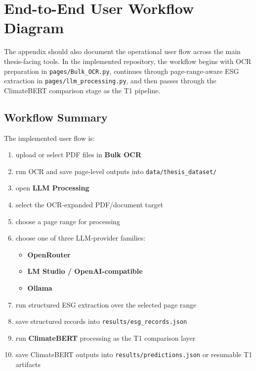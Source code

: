 \documentclass[english, online, cse, master]{dithesis}
\providecommand{\tightlist}{\setlength{\itemsep}{0pt}\setlength{\parskip}{0pt}}
\begin{document}
\section{End-to-End User Workflow Diagram}\label{end-to-end-user-workflow-diagram}

The appendix should also document the operational user flow across the main thesis-facing tools. In the implemented repository, the workflow begins with OCR preparation in \texttt{pages/Bulk\_OCR.py}, continues through page-range-aware ESG extraction in \texttt{pages/llm\_processing.py}, and then passes through the ClimateBERT comparison stage as the T1 pipeline.

\subsection{Workflow Summary}\label{workflow-summary}

The implemented user flow is:

\begin{enumerate}
\def\labelenumi{\arabic{enumi}.}
\tightlist
\item
  upload or select PDF files in \textbf{Bulk OCR}
\item
  run OCR and save page-level outputs into \texttt{data/thesis\_dataset/}
\item
  open \textbf{LLM Processing}
\item
  select the OCR-expanded PDF/document target
\item
  choose a page range for processing
\item
  choose one of three LLM-provider families:

  \begin{itemize}
  \tightlist
  \item
    \textbf{OpenRouter}
  \item
    \textbf{LM Studio / OpenAI-compatible}
  \item
    \textbf{Ollama}
  \end{itemize}
\item
  run structured ESG extraction over the selected page range
\item
  save structured records into \texttt{results/esg\_records.json}
\item
  run \textbf{ClimateBERT} processing as the T1 comparison layer
\item
  save ClimateBERT outputs into \texttt{results/predictions.json} or resumable T1 artifacts
\end{enumerate}
\end{document}
